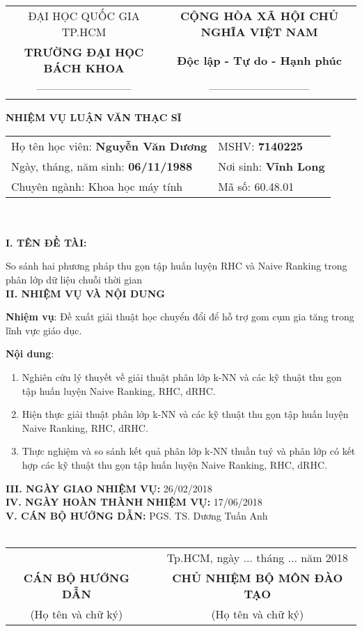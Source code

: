 \begin{titlepage}

\begin{tabular}{c c}

\small ĐẠI HỌC QUỐC GIA TP.HCM & \small \textbf{CỘNG HÒA XÃ HỘI CHỦ NGHĨA VIỆT NAM}\\
\textbf{TRƯỜNG ĐẠI HỌC BÁCH KHOA}& \textbf{Độc lập - Tự do - Hạnh phúc}\\
--------------------------& ---------------------------
\end{tabular}

\vspace{1cm}
\centerline{\Large \textbf{NHIỆM VỤ LUẬN VĂN THẠC SĨ}}
\vspace{1cm}
\begin{tabular}{p{7cm} p{4cm}}
Họ tên học viên: \textbf{Nguyễn Văn Dương} & MSHV: \textbf{7140225} \\
Ngày, tháng, năm sinh: \textbf{06/11/1988} & Nơi sinh: \textbf{Vĩnh Long} \\
Chuyên ngành: Khoa học máy tính & Mã số: 60.48.01\\
\end{tabular}\\\\
\textbf{I. TÊN ĐỀ TÀI:}

So sánh hai phương pháp thu gọn tập huấn luyện RHC và Naive Ranking trong phân lớp dữ liệu chuỗi thời gian\\
\hspace{1cm} \textbf{II. NHIỆM VỤ VÀ NỘI DUNG}

\textbf{Nhiệm vụ}: Đề xuất giải thuật học chuyển đổi để hỗ trợ gom cụm gia tăng trong lĩnh vực giáo dục.

\textbf{Nội dung}:
\begin{enumerate}
\item Nghiên cứu lý thuyết về giải thuật phân lớp k-NN và các kỹ thuật thu gọn tập huấn luyện Naive Ranking, RHC, dRHC.
\item Hiện thực giải thuật phân lớp k-NN và các kỹ thuật thu gọn tập huấn luyện Naive Ranking, RHC, dRHC.
\item Thực nghiệm và so sánh kết quả phân lớp k-NN thuần tuý và phân lớp có kết hợp các kỹ thuật thu gọn tập huấn luyện Naive Ranking, RHC, dRHC.

\end{enumerate}
\textbf{III. NGÀY GIAO NHIỆM VỤ:} 26/02/2018 \\
\textbf{IV. NGÀY HOÀN THÀNH NHIỆM VỤ:} 17/06/2018 \\
\textbf{V. CÁN BỘ HƯỚNG DẪN:} PGS. TS. Dương Tuấn Anh \\\\
\begin{tabular}{c p{2cm} c}
 & &Tp.HCM, ngày ... tháng ... năm 2018\\
\textbf{CÁN BỘ HƯỚNG DẪN}& & \textbf{CHỦ NHIỆM BỘ MÔN ĐÀO TẠO}\\
\tiny (Họ tên và chữ ký) & & \tiny (Họ tên và chữ ký)\\


\end{tabular}
\end{titlepage}
